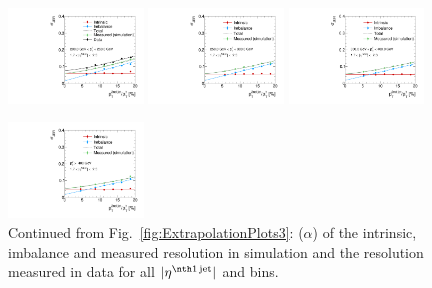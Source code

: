 \begin{figure}[ht]
 \centering
    \includegraphics[width=0.32\textwidth]{figures/resolution/results/JER_for_4_eta_bin_9_pTGamma_bin_all_contributions_PFCHS_RMS99_mc.pdf}
    \includegraphics[width=0.32\textwidth]{figures/resolution/results/JER_for_4_eta_bin_10_pTGamma_bin_all_contributions_PFCHS_RMS99_mc.pdf}
    \includegraphics[width=0.32\textwidth]{figures/resolution/results/JER_for_4_eta_bin_11_pTGamma_bin_all_contributions_PFCHS_RMS99_mc.pdf}

    \includegraphics[width=0.32\textwidth]{figures/resolution/results/JER_for_4_eta_bin_12_pTGamma_bin_all_contributions_PFCHS_RMS99_mc.pdf}
  \caption{Continued from Fig.~\ref{fig:ExtrapolationPlots3}: \jer($\alpha$) of the intrinsic, imbalance and measured resolution in simulation and the resolution measured in data for all $|\etafirstjet|$ and \ptgamma bins.}
  \label{fig:ExtrapolationPlots4}
\end{figure}
